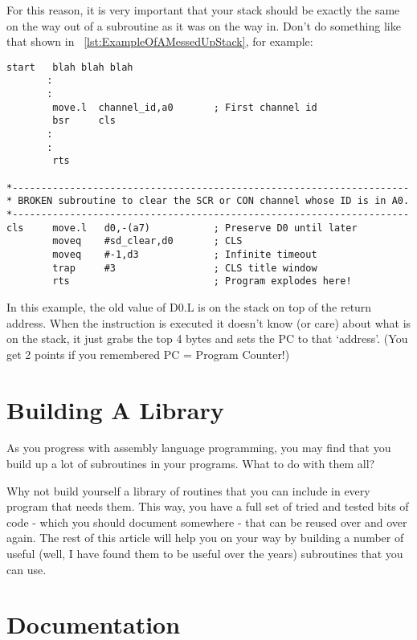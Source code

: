 For this reason, it is very important that your stack should be
    exactly the same on the way out of a subroutine as it was on the way in.
    Don't do something like that shown in \lstlistingname~\ref{lst:ExampleOfAMessedUpStack}, for example:

\begin{lstlisting}[firstnumber=1,caption={Example of a Messed up Stack!},label={lst:ExampleOfAMessedUpStack}]
start   blah blah blah
       :
       :
        move.l  channel_id,a0       ; First channel id
        bsr     cls
       :
       :
        rts

*---------------------------------------------------------------------
* BROKEN subroutine to clear the SCR or CON channel whose ID is in A0.
*---------------------------------------------------------------------
cls     move.l   d0,-(a7)           ; Preserve D0 until later
        moveq    #sd_clear,d0       ; CLS
        moveq    #-1,d3             ; Infinite timeout
        trap     #3                 ; CLS title window
        rts                         ; Program explodes here!
\end{lstlisting}

In this example, the old value of D0.L is on the stack on top of the
    return address. When the  instruction is executed it doesn't know (or
    care) about what is on the stack, it just grabs the top 4 bytes and sets
    the PC to that `address'. (You get 2 points if you remembered PC = Program
    Counter!)

\section{Building A Library}
\label{ch9-build-library}%

As you progress with assembly language programming, you may find
    that you build up a lot of subroutines in your programs. What to do with
    them all?

Why not build yourself a library of routines that you can include in
    every program that needs them. This way, you have a full set of tried and
    tested bits of code -{} which you should document somewhere -{} that can be
    reused over and over again. The rest of this article will help you on your
    way by building a number of useful (well, I have found them to be useful
    over the years) subroutines that you can use.

\section{Documentation}
\label{ch9-documentation}%

